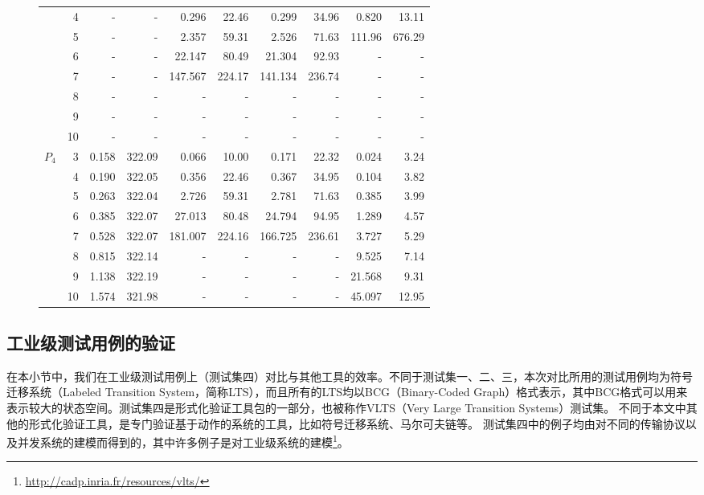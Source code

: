 \begin{figure}[h!]
\begin{tabular}{| r | r | r | r | r | r | r | r | r | r |}
		{} & 4 & - & - & 0.296 & 22.46 & 0.299 & 34.96 & 0.820 & 13.11  \\
		{} & 5 & - & - & 2.357 & 59.31 & 2.526 & 71.63 & 111.96 & 676.29  \\
		{} & 6 & - & - & 22.147 & 80.49 & 21.304 & 92.93 & - & -  \\
		{} & 7 & - & - & 147.567 & 224.17 & 141.134 & 236.74 & - & -  \\
		{} & 8 & - & - & - & - & - & - & - & -  \\
		{} & 9 & - & - & - & - & - & - & - & -  \\
		{} & 10 & - & - & - & - & - & - & - & -  \\
		\hline
		\multirow{6}{*}{$P_4$} & 3 & 0.158 & 322.09 & 0.066 & 10.00 & 0.171 & 22.32 & 0.024 & 3.24  \\
		{} & 4 & 0.190 & 322.05 & 0.356 & 22.46 & 0.367 & 34.95 & 0.104 & 3.82  \\
		{} & 5 & 0.263 & 322.04 & 2.726 & 59.31 & 2.781 & 71.63 & 0.385 & 3.99  \\
		{} & 6 & 0.385 & 322.07 & 27.013 & 80.48 & 24.794 & 94.95 & 1.289 & 4.57  \\
		{} & 7 & 0.528 & 322.07 & 181.007 & 224.16 & 166.725 & 236.61 & 3.727 & 5.29  \\
		{} & 8 & 0.815 & 322.14 & - & - & - & - & 9.525 & 7.14  \\
		{} & 9 & 1.138 & 322.19 & - & - & - & - & 21.568 & 9.31  \\
		{} & 10 & 1.574 & 321.98 & - & - & - & - & 45.097 & 12.95  \\
		\hline
	\end{tabular}
	
	\label{tabl:data:ring}
\end{figure}

\subsection{工业级测试用例的验证}	\label{subsc:vlts}
在本小节中，我们在工业级测试用例上（测试集四）对比\sctl{}与其他工具的效率。不同于测试集一、二、三，本次对比所用的测试用例均为符号迁移系统（Labeled Transition System，简称\textsf{LTS}），而且所有的\textsf{LTS}均以\textsf{BCG}（Binary-Coded Graph）格式表示，其中\textsf{BCG}格式可以用来表示较大的状态空间。测试集四是形式化验证工具包\CADP{}\cite{GaravelLMS13}的一部分，也被称作\textsf{VLTS}（Very Large Transition Systems）测试集。
不同于本文中其他的形式化验证工具，\CADP{}是专门验证基于动作的系统的工具，比如符号迁移系统、马尔可夫链等。
测试集四中的例子均由对不同的传输协议以及并发系统的建模而得到的，其中许多例子是对工业级系统的建模\footnote{\url{http://cadp.inria.fr/resources/vlts/}}。

